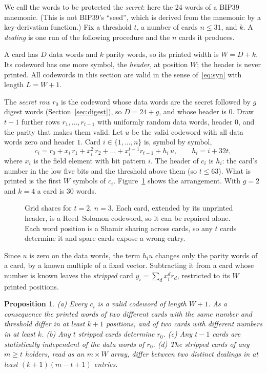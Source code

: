 \documentclass[numeric]{anvil-paper}
\newtheorem{proposition}{Proposition}
\begin{document}
We call the words to be protected the \emph{secret}: here the 24 words of a
BIP39 mnemonic. (This is not BIP39's ``seed'', which is derived from the
mnemonic by a key-derivation function.) Fix a threshold $t$, a number of cards
$n\le 31$, and $k$. A \emph{dealing} is one run of the following procedure and
the $n$ cards it produces.

A card has $D$ data words and $k$ parity words, so its printed width is
$W=D+k$. Its codeword has one more symbol, the \emph{header}, at position $W$;
the header is never printed. All codewords in this section are valid in the
sense of~\eqref{eq:syn} with length $L=W+1$.

The \emph{secret row} $r_0$ is the codeword whose data words are the secret
followed by $g$ digest words (Section~\ref{sec:digest}), so $D=24+g$, and whose
header is $0$. Draw $t-1$ further rows $r_1,\dots,r_{t-1}$ with uniformly random
data words, header $0$, and the parity that makes them valid. Let $u$ be the
valid codeword with all data words zero and header $1$. Card $i\in\{1,\dots,n\}$
is, symbol by symbol,
\begin{equation}
c_i = r_0 + x_i\,r_1 + x_i^2\,r_2+\dots+x_i^{t-1}r_{t-1} + h_i\,u,
\qquad h_i = i+32t ,
\label{eq:card}
\end{equation}
where $x_i$ is the field element with bit pattern $i$. The header of $c_i$ is
$h_i$: the card's number in the low five bits and the threshold above them
(so $t\le 63$). What is printed is the first $W$ symbols of $c_i$.
Figure~\ref{fig:grid} shows the arrangement. With $g=2$ and $k=4$ a card is 30
words.

\begin{figure}[!htb]
\centering

\caption{Grid shares for $t=2$, $n=3$. Each card, extended by its unprinted
header, is a Reed--Solomon codeword, so it can be repaired alone. Each word
position is a Shamir sharing across cards, so any $t$ cards determine it and
spare cards expose a wrong entry.}
\label{fig:grid}
\end{figure}

Since $u$ is zero on the data words, the term $h_i u$ changes only the parity
words of a card, by a known multiple of a fixed vector. Subtracting it from a
card whose number is known leaves the \emph{stripped} card
$y_i=\sum_d x_i^d r_d$, restricted to its $W$ printed positions.

\begin{proposition}
\label{prop:grid}
(a) Every $c_i$ is a valid codeword of length $W+1$. As a consequence the
printed words of two different cards with the same number and threshold differ in at least
$k+1$ positions, and of two cards with different numbers in at least $k$.
(b) Any $t$ stripped cards determine $r_0$.
(c) Any $t-1$ cards are statistically independent of the data words of $r_0$.
(d) The stripped cards of any $m\ge t$ holders, read as an $m\times W$ array,
differ between two distinct dealings in at least $(k+1)(m-t+1)$ entries.
\end{proposition}
\end{document}
